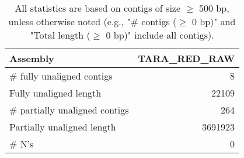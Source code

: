 \documentclass[12pt,a4paper]{article}
\begin{document}
\begin{table}[ht]
\begin{center}
\caption{All statistics are based on contigs of size $\geq$ 500 bp, unless otherwise noted (e.g., "\# contigs ($\geq$ 0 bp)" and "Total length ($\geq$ 0 bp)" include all contigs).}
\begin{tabular}{|l*{1}{|r}|}
\hline
Assembly & TARA\_RED\_RAW \\ \hline
\# fully unaligned contigs & 8 \\ \hline
Fully unaligned length & 22109 \\ \hline
\# partially unaligned contigs & 264 \\ \hline
Partially unaligned length & 3691923 \\ \hline
\# N's & 0 \\ \hline
\end{tabular}
\end{center}
\end{table}
\end{document}
